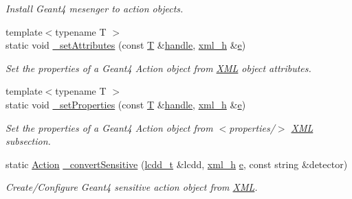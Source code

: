 \begin{DoxyCompactItemize}
\begin{DoxyCompactList}\small\item\em Install Geant4 mesenger to action objects. \end{DoxyCompactList}\item 
{\footnotesize template$<$typename T $>$ }\\static void \hyperlink{namespace_d_d4hep_1_1_simulation_a21b5b5f940b68d7c063536de13591e84}{\+\_\+set\+Attributes} (const \hyperlink{class_t}{T} \&\hyperlink{_geant4_converter_8cpp_a3789cd8800e1433fb917a1d6f85ef67d}{handle}, \hyperlink{_det_factory_helper_8h_ac13b3c79d2bc9214ff0cf5b8dc43dda6}{xml\+\_\+h} \&\hyperlink{_volumes_8cpp_a8a9a1f93e9b09afccaec215310e64142}{e})
\begin{DoxyCompactList}\small\item\em Set the properties of a Geant4 Action object from \hyperlink{namespace_d_d4hep_1_1_x_m_l}{X\+ML} object attributes. \end{DoxyCompactList}\item 
{\footnotesize template$<$typename T $>$ }\\static void \hyperlink{namespace_d_d4hep_1_1_simulation_a3f99c3ce830efd1ab0e5b5a04216cbb4}{\+\_\+set\+Properties} (const \hyperlink{class_t}{T} \&\hyperlink{_geant4_converter_8cpp_a3789cd8800e1433fb917a1d6f85ef67d}{handle}, \hyperlink{_det_factory_helper_8h_ac13b3c79d2bc9214ff0cf5b8dc43dda6}{xml\+\_\+h} \&\hyperlink{_volumes_8cpp_a8a9a1f93e9b09afccaec215310e64142}{e})
\begin{DoxyCompactList}\small\item\em Set the properties of a Geant4 Action object from $<$properties/$>$ \hyperlink{namespace_d_d4hep_1_1_x_m_l}{X\+ML} subsection. \end{DoxyCompactList}\item 
static \hyperlink{namespace_d_d4hep_1_1_simulation_1_1_setup_aa958972310161bf099d9d22e59d257ab}{Action} \hyperlink{namespace_d_d4hep_1_1_simulation_ad1e0a4ddeeaccc10df73eaae26c7706b}{\+\_\+convert\+Sensitive} (\hyperlink{namespace_d_d4hep_a9d7154801ec259f2a1d2fe015d140518}{lcdd\+\_\+t} \&lcdd, \hyperlink{_det_factory_helper_8h_ac13b3c79d2bc9214ff0cf5b8dc43dda6}{xml\+\_\+h} \hyperlink{_volumes_8cpp_a8a9a1f93e9b09afccaec215310e64142}{e}, const string \&detector)
\begin{DoxyCompactList}\small\item\em Create/\+Configure Geant4 sensitive action object from \hyperlink{namespace_d_d4hep_1_1_x_m_l}{X\+ML}. \end{DoxyCompactList}\item 

\end{DoxyCompactItemize}
